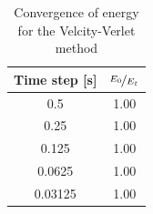 \documentclass[12pt, letterpaper]{article}
\begin{document}
\begin{table}[h]
  \centering
  \caption{Convergence of energy for the Velcity-Verlet method}
  \label{tab:pend}
  \begin{tabular}{c c}
    \hline\hline
    Time step [s] & \(\nicefrac{E_0}{E_t}\) \\
    \hline
    0.5     & 1.00 \\
    0.25    & 1.00 \\
    0.125   & 1.00 \\
    0.0625  & 1.00 \\
    0.03125 & 1.00 \\
    \hline\hline
  \end{tabular}
\end{table}
\end{document}
